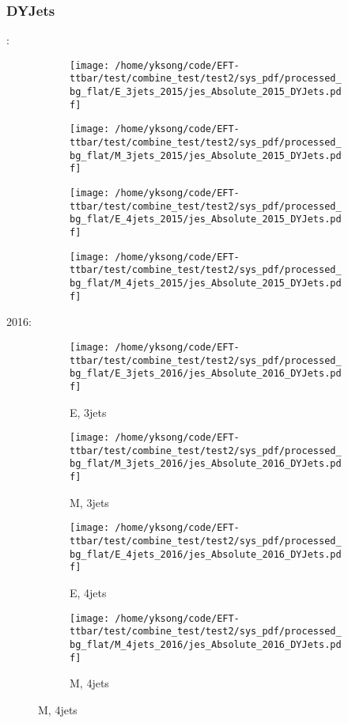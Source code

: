 \documentclass{beamer}
\begin{document}
\begin{frame}
\frametitle{DYJets}
\fontsize{5}{1}:
\begin{figure}
\centering
\begin{subfigure}[b]{0.24\textwidth}
\texttt{[image: /home/yksong/code/EFT-ttbar/test/combine\_test/test2/sys\_pdf/processed\_bg\_flat/E\_3jets\_2015/jes\_Absolute\_2015\_DYJets.pdf]}
\end{subfigure}
\begin{subfigure}[b]{0.24\textwidth}
\texttt{[image: /home/yksong/code/EFT-ttbar/test/combine\_test/test2/sys\_pdf/processed\_bg\_flat/M\_3jets\_2015/jes\_Absolute\_2015\_DYJets.pdf]}
\end{subfigure}
\begin{subfigure}[b]{0.24\textwidth}
\texttt{[image: /home/yksong/code/EFT-ttbar/test/combine\_test/test2/sys\_pdf/processed\_bg\_flat/E\_4jets\_2015/jes\_Absolute\_2015\_DYJets.pdf]}
\end{subfigure}
\begin{subfigure}[b]{0.24\textwidth}
\texttt{[image: /home/yksong/code/EFT-ttbar/test/combine\_test/test2/sys\_pdf/processed\_bg\_flat/M\_4jets\_2015/jes\_Absolute\_2015\_DYJets.pdf]}
\end{subfigure}
\end{figure}
2016:
\begin{figure}
\centering
\begin{subfigure}[b]{0.24\textwidth}
\texttt{[image: /home/yksong/code/EFT-ttbar/test/combine\_test/test2/sys\_pdf/processed\_bg\_flat/E\_3jets\_2016/jes\_Absolute\_2016\_DYJets.pdf]}
\captionsetup{font=tiny}
\caption{E, 3jets}
\end{subfigure}
\begin{subfigure}[b]{0.24\textwidth}
\texttt{[image: /home/yksong/code/EFT-ttbar/test/combine\_test/test2/sys\_pdf/processed\_bg\_flat/M\_3jets\_2016/jes\_Absolute\_2016\_DYJets.pdf]}
\captionsetup{font=tiny}
\caption{M, 3jets}
\end{subfigure}
\begin{subfigure}[b]{0.24\textwidth}
\texttt{[image: /home/yksong/code/EFT-ttbar/test/combine\_test/test2/sys\_pdf/processed\_bg\_flat/E\_4jets\_2016/jes\_Absolute\_2016\_DYJets.pdf]}
\captionsetup{font=tiny}
\caption{E, 4jets}
\end{subfigure}
\begin{subfigure}[b]{0.24\textwidth}
\texttt{[image: /home/yksong/code/EFT-ttbar/test/combine\_test/test2/sys\_pdf/processed\_bg\_flat/M\_4jets\_2016/jes\_Absolute\_2016\_DYJets.pdf]}
\captionsetup{font=tiny}
\caption{M, 4jets}
\end{subfigure}
\end{figure}
\end{frame}
\end{document}
